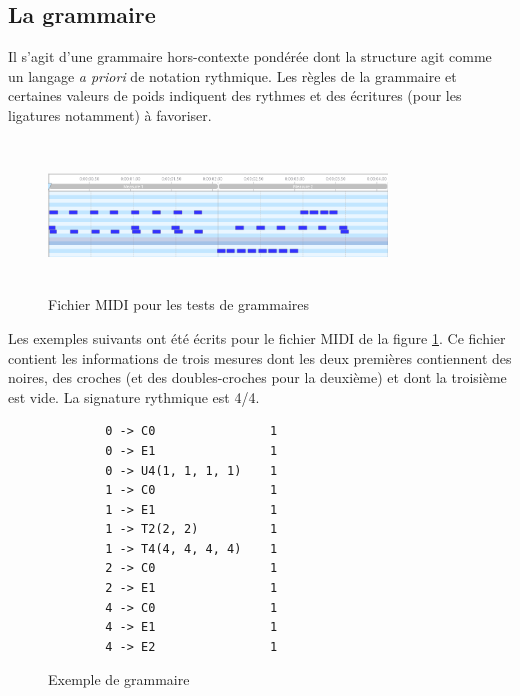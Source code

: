 \subsection*{La grammaire}
\label{gram}
Il s’agit d’une grammaire hors-contexte pondérée dont la structure agit comme
un langage \textit{a priori} de notation rythmique. Les règles de la grammaire et
certaines valeurs de poids indiquent des rythmes et des écritures (pour les
ligatures notamment) à favoriser.\\

\begin{figure}[h]
    \centering
    \includegraphics[height=40mm, width=90mm]{
    z_images/4_experimentations/3_developpement/0_midi_2bars_fill.png}
    \caption{Fichier MIDI pour les tests de grammaires}
    \label{midi_gram}
\end{figure}

Les exemples suivants ont été écrits pour le fichier MIDI de la figure
\ref{midi_gram}. Ce fichier contient les informations de trois mesures dont les
deux premières contiennent des noires, des croches (et des doubles-croches pour
la deuxième) et dont la troisième est vide. La signature rythmique est
4/4.  

\begin{figure}[h]
    \centering
    \begin{verbatim}
        0 -> C0                1
        0 -> E1                1
        0 -> U4(1, 1, 1, 1)    1
        1 -> C0                1
        1 -> E1                1
        1 -> T2(2, 2)          1
        1 -> T4(4, 4, 4, 4)    1
        2 -> C0                1
        2 -> E1                1
        4 -> C0                1
        4 -> E1                1
        4 -> E2                1
        \end{verbatim}
        \caption{Exemple de grammaire}
        \label{ex_gram}
\end{figure}

